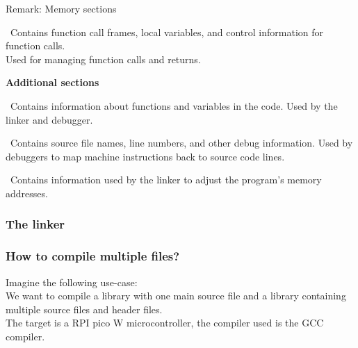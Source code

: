 \documentclass{beamer}
\begin{document}
\begin{frame}[fragile]
\begin{block}{Remark: Memory sections}
\begin{description}[leftmargin=!]
\item[Stack:] \ 
    Contains function call frames, local variables, and control information for function calls. \\
    Used for managing function calls and returns.
\end{description}
\textbf{Additional sections}
\begin{description}[leftmargin=!]
    \item[Symbol Table (symtab):] \
     Contains information about functions and variables in the code.
        Used by the linker and debugger.
    \item[Debug Information:] \
     Contains source file names, line numbers, and other debug information.
         Used by debuggers to map machine instructions back to source code lines.
    \item[Relocation Table:] \
     Contains information used by the linker to adjust the program’s memory addresses.
\end{description}
\end{block}
\end{frame}

\begin{frame}[fragile]
    \frametitle{The linker}
\end{frame}

\begin{frame}

\frametitle{How to compile multiple files?}
Imagine the following use-case: \\
We want to compile a library with one main source file and a library containing multiple source files and header files. \\ \bigskip
The target is a RPI pico W microcontroller, the compiler used is the GCC compiler.
\end{frame}
\end{document}

